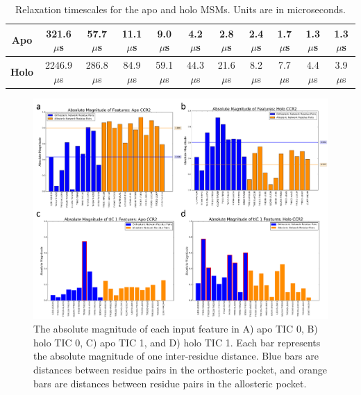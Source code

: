 \begin{table}[htbp]
\centering
\begin{tabular}{|c|c|c|c|c|c|c|c|c|c|c|}
\hline
\textbf{Apo} & 321.6 $\mu$s & 57.7 $\mu$s & 11.1 $\mu$s & 9.0 $\mu$s & 4.2 $\mu$s & 2.8 $\mu$s & 2.4 $\mu$s & 1.7 $\mu$s & 1.3 $\mu$s & 1.3 $\mu$s\\ \hline
\textbf{Holo} & 2246.9 $\mu$s & 286.8 $\mu$s & 84.9 $\mu$s & 59.1 $\mu$s & 44.3 $\mu$s & 21.6 $\mu$s & 8.2 $\mu$s & 7.7 $\mu$s & 4.4 $\mu$s & 3.9 $\mu$s \\ \hline
\end{tabular}
\caption[Relaxation timescales for apo and holo CCR2 MSMs]{Relaxation timescales for the apo and holo MSMs. Units are in microseconds.}
\label{table:relaxation_timescales}
\end{table}

\begin{figure}[htbp]
  \begin{center}
  \includegraphics[width=\textwidth]{./figures/tic0_tic1_contributions.png}
\caption[Correlation of TICs to CCR2 features]{The absolute magnitude of each input feature in A) apo TIC 0, B) holo TIC 0, C) apo TIC 1, and D) holo TIC 1. Each bar represents the absolute magnitude of one inter-residue distance. Blue bars are distances between residue pairs in the orthosteric pocket, and orange bars are distances between residue pairs in the allosteric pocket.}
\label{fig:tic0_contributions}
  \end{center}
\end{figure}

